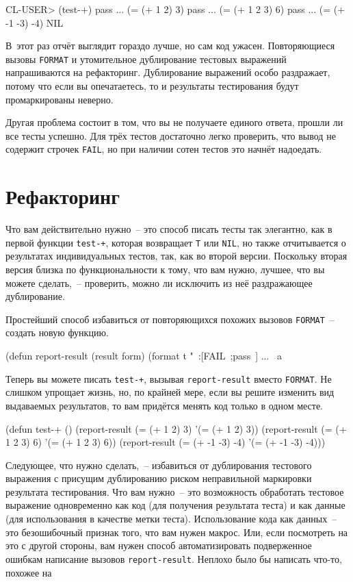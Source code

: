 \begin{myverb}
CL-USER> (test-+)
pass ... (= (+ 1 2) 3)
pass ... (= (+ 1 2 3) 6)
pass ... (= (+ -1 -3) -4)
NIL
\end{myverb}

В~этот раз отчёт выглядит гораздо лучше, но сам код ужасен. Повторяющиеся вызовы
\lstinline{FORMAT} и утомительное дублирование тестовых выражений напрашиваются на
рефакторинг. Дублирование выражений особо раздражает, потому что если вы опечатаетесь, то
и результаты тестирования будут промаркированы неверно.

Другая проблема состоит в том, что вы не получаете единого ответа, прошли ли все
тесты успешно. Для трёх тестов достаточно легко проверить, что вывод не содержит
строчек \lstinline{FAIL}, но при наличии сотен тестов это начнёт надоедать.

\section{Рефакторинг}

Что вам действительно нужно~-- это способ писать тесты так элегантно, как в первой
функции \lstinline{test-+}, которая возвращает \lstinline{T} или \lstinline{NIL}, но также отчитывается о
результатах индивидуальных тестов, так, как во второй версии. Поскольку вторая версия
близка по функциональности к тому, что вам нужно, лучшее, что вы можете сделать,~--
проверить, можно ли исключить из неё раздражающее дублирование.

Простейший способ избавиться от повторяющихся похожих вызовов \lstinline{FORMAT}~-- создать
новую функцию.

\begin{myverb}
(defun report-result (result form)
  (format t "~:[FAIL~;pass~] ... ~a~%
\end{myverb}

Теперь вы можете писать \lstinline{test-+}, вызывая \lstinline{report-result} вместо
\lstinline{FORMAT}. Не слишком упрощает жизнь, но, по крайней мере, если вы решите изменить вид
выдаваемых результатов, то вам придётся менять код только в одном месте.

\begin{myverb}
(defun test-+ ()
  (report-result (= (+ 1 2) 3) '(= (+ 1 2) 3))
  (report-result (= (+ 1 2 3) 6) '(= (+ 1 2 3) 6))
  (report-result (= (+ -1 -3) -4) '(= (+ -1 -3) -4)))
\end{myverb}

Следующее, что нужно сделать,~-- избавиться от дублирования тестового выражения с
присущим дублированию риском неправильной маркировки результата тестирования. Что вам
нужно~-- это возможность обработать тестовое выражение одновременно как код (для
получения результата теста) и как данные (для использования в качестве метки
теста). Использование кода как данных~-- это безошибочный признак того, что вам нужен
макрос. Или, если посмотреть на это с другой стороны, вам нужен способ автоматизировать
подверженное ошибкам написание вызовов \lstinline{report-result}. Неплохо было бы написать
что-то, похожее на

